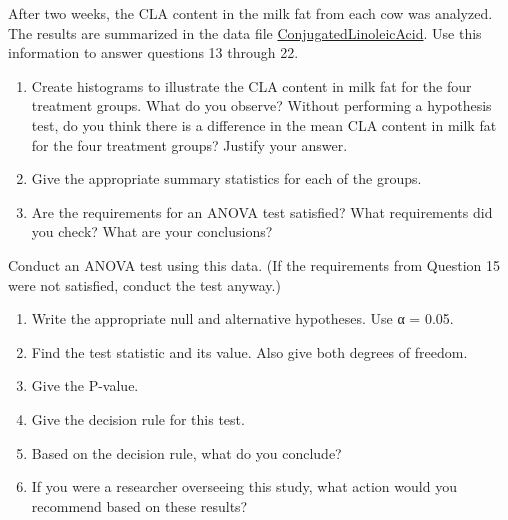 \documentclass[]{article}
\begin{document}
After two weeks, the CLA content in the milk fat from each cow was
analyzed. The results are summarized in the data file
\href{http://statistics.byuimath.com/index.php?title=Data}{ConjugatedLinoleicAcid}.
Use this information to answer questions 13 through 22.

\begin{enumerate}
\def\labelenumi{\arabic{enumi}.}
\setcounter{enumi}{11}
\item
  Create histograms to illustrate the CLA content in milk fat for the
  four treatment groups. What do you observe? Without performing a
  hypothesis test, do you think there is a difference in the mean CLA
  content in milk fat for the four treatment groups? Justify your
  answer.
\item
  Give the appropriate summary statistics for each of the groups.
\item
  Are the requirements for an ANOVA test satisfied? What requirements
  did you check? What are your conclusions?
\end{enumerate}

Conduct an ANOVA test using this data. (If the requirements from
Question 15 were not satisfied, conduct the test anyway.)

\begin{enumerate}
\def\labelenumi{\arabic{enumi}.}
\setcounter{enumi}{14}
\item
  Write the appropriate null and alternative hypotheses. Use α = 0.05.
\item
  Find the test statistic and its value. Also give both degrees of
  freedom.
\item
  Give the P-value.
\item
  Give the decision rule for this test.
\item
  Based on the decision rule, what do you conclude?
\item
  If you were a researcher overseeing this study, what action would you
  recommend based on these results?
\end{enumerate}
\end{document}
